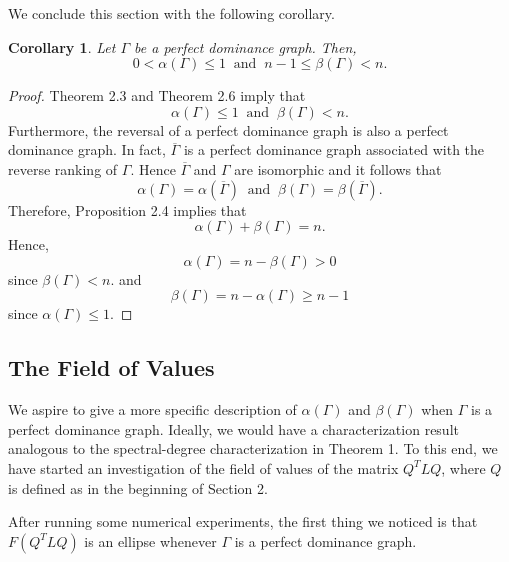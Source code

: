\documentclass{article}
\newtheorem{corollary}[theorem]{Corollary}
\newcommand*\conj[1]{\overline{#1}}
\begin{document}
We conclude this section with the following corollary.

\begin{corollary}
Let $\Gamma$ be a perfect dominance graph.
Then,
\[
0<\alpha(\Gamma)\leq 1
~\text{ and }~
n-1\leq \beta(\Gamma) < n.
\]
\end{corollary}
\begin{proof}
Theorem 2.3 and Theorem 2.6 imply that
\[
\alpha(\Gamma)\leq 1
~\text{ and }~
\beta(\Gamma)<n.
\]
Furthermore, the reversal of a perfect dominance graph is also a perfect dominance graph.
In fact, $\conj{\Gamma}$ is a perfect dominance graph associated with the reverse ranking of $\Gamma$.
Hence $\conj{\Gamma}$ and $\Gamma$ are isomorphic and it follows that 
\[
\alpha(\Gamma)=\alpha(\conj{\Gamma})
~\text{ and }~
\beta(\Gamma)=\beta(\conj{\Gamma}).
\]
Therefore, Proposition 2.4 implies that
\[
\alpha(\Gamma)+\beta(\Gamma)=n.
\]
Hence,
\[
\alpha(\Gamma)=n-\beta(\Gamma)>0
\]
since $\beta(\Gamma)<n$. and
\[
\beta(\Gamma)=n-\alpha(\Gamma)\geq n-1
\]
since $\alpha(\Gamma)\leq 1$. 
\end{proof}

\subsection{The Field of Values}
We aspire to give a more specific description of $\alpha(\Gamma)$ and $\beta(\Gamma)$ when $\Gamma$ is a perfect dominance graph. 
Ideally, we would have a characterization result analogous to the spectral-degree characterization in Theorem 1. 
To this end, we have started an investigation of the field of values of the matrix $Q^{T}LQ$, where $Q$ is defined as in the beginning of Section 2.

After running some numerical experiments, the first thing we noticed is that $F(Q^{T}LQ)$ is an ellipse whenever $\Gamma$ is a perfect dominance graph. 

\label{Bibliography}


\end{document}
